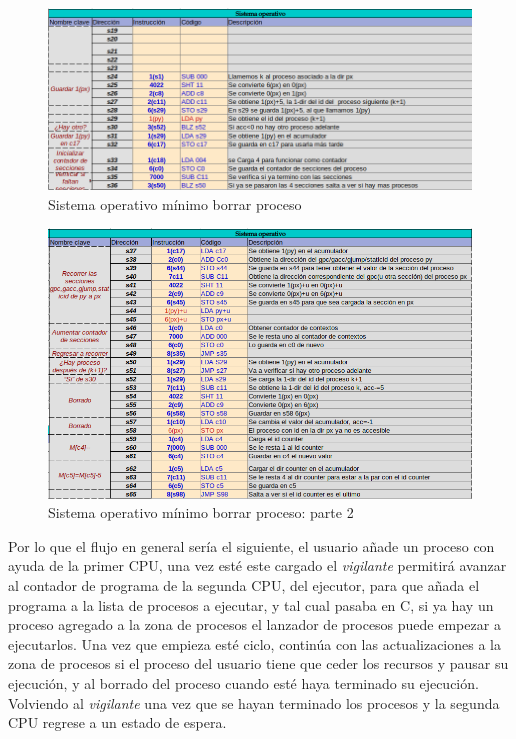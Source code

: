 \documentclass[letterpaper,12pt,oneside]{book}
\begin{document}
			
			\begin{figure}[H]		
				\centering
				\includegraphics[scale=0.53]{media/Paralela/sop_erase1.png}
				\caption{Sistema operativo mínimo borrar proceso}
				\label{fig:sop_erase1}
			\end{figure}
			
			
			\begin{figure}[H]		
				\centering
				\includegraphics[scale=0.53]{media/Paralela/sop_erase2.png}
				\caption{Sistema operativo mínimo borrar proceso: parte 2}
				\label{fig:sop_erase2}
			\end{figure}

			
				Por lo que el flujo en general sería el siguiente, el usuario añade un proceso con ayuda de la primer CPU, una vez esté este cargado
				el \textit{vigilante} permitirá avanzar al contador de programa de la segunda CPU, del ejecutor, para que añada el programa a la lista
				de procesos a ejecutar, y tal cual pasaba en C, si ya hay un proceso agregado a la zona de procesos el lanzador de procesos
				puede empezar a ejecutarlos. Una vez que empieza esté ciclo, continúa con las actualizaciones a la zona de procesos
				si el proceso del usuario tiene que ceder los recursos y pausar su ejecución, y al borrado del proceso cuando
				esté haya terminado su ejecución. Volviendo al \textit{vigilante} una vez que se hayan terminado los procesos
				y la segunda CPU regrese a un estado de espera.
\end{document}
